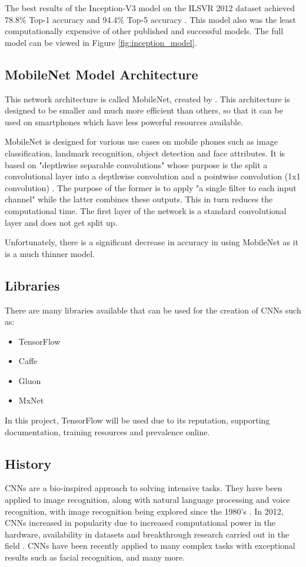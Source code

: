 The best results of the Inception-V3 model on the ILSVR 2012 dataset achieved 78.8\% Top-1 accuracy and 94.4\% Top-5 accuracy \parencite{rethinkingInception}.
This model also was the least computationally expensive of other published and successful models.
The full model can be viewed in Figure \ref{fig:inception_model}.

\clearpage


\tocless\subsection{MobileNet Model Architecture}
This network architecture is called MobileNet, created by \parencite{mobilenet}.
This architecture is designed to be smaller and much more efficient than others, so that
it can be used on smartphones which have less powerful resources available.

MobileNet is designed for various use cases on mobile phones such as image classification, landmark recognition, object detection and face attributes.
It is based on "depthwise separable convolutions" whose purpose is the split a convolutional layer into a depthwise convolution and a pointwise convolution (1x1 convolution) \parencite{mobilenet}.
The purpose of the former is to apply "a single filter to each input channel" \parencite{mobilenet} while the latter combines these outputs.
This in turn reduces the computational time.
The first layer of the network is a standard convolutional layer and does not get split up.

Unfortunately, there is a significant decrease in accuracy in using MobileNet as it is a much thinner model.


\tocless\subsection{Libraries}
There are many libraries available that can be used for the creation of CNNs such as:
\begin{itemize}
    \item{TensorFlow}
    \item{Caffe}
    \item{Gluon}
    \item{MxNet}
\end{itemize}
In this project, TensorFlow will be used due to its reputation, supporting documentation, training resources and prevalence online.


\tocless\subsection{History}
CNNs are a bio-inspired approach to solving intensive tasks.
They have been applied to image recognition, along with natural language processing and voice recognition, with image recognition being explored since the 1980's \parencite{handsOnML}.
In 2012, CNNs increased in popularity due to increased computational power in the hardware, availability in datasets and breakthrough research carried out in the field \parencite{krizhevsky2012imagenet}.
CNNs have been recently applied to many complex tasks with exceptional results such as facial recognition, and many more.